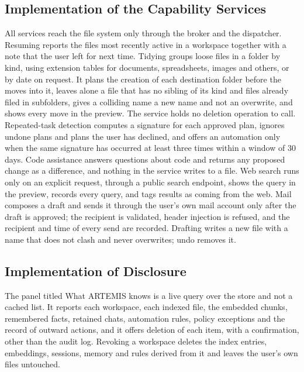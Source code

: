\documentclass{FastFyp}
\begin{document}
\subsection{Implementation of the Capability Services}
All services reach the file system only through the broker and the dispatcher. Resuming reports the files most recently active in a workspace together with a note that the user left for next time. Tidying groups loose files in a folder by kind, using extension tables for documents, spreadsheets, images and others, or by date on request. It plans the creation of each destination folder before the moves into it, leaves alone a file that has no sibling of its kind and files already filed in subfolders, gives a colliding name a new name and not an overwrite, and shows every move in the preview. The service holds no deletion operation to call. Repeated-task detection computes a signature for each approved plan, ignores undone plans and plans the user has declined, and offers an automation only when the same signature has occurred at least three times within a window of 30 days. Code assistance answers questions about code and returns any proposed change as a difference, and nothing in the service writes to a file. Web search runs only on an explicit request, through a public search endpoint, shows the query in the preview, records every query, and tags results as coming from the web. Mail composes a draft and sends it through the user's own mail account only after the draft is approved; the recipient is validated, header injection is refused, and the recipient and time of every send are recorded. Drafting writes a new file with a name that does not clash and never overwrites; undo removes it.

\subsection{Implementation of Disclosure}
The panel titled What ARTEMIS knows is a live query over the store and not a cached list. It reports each workspace, each indexed file, the embedded chunks, remembered facts, retained chats, automation rules, policy exceptions and the record of outward actions, and it offers deletion of each item, with a confirmation, other than the audit log. Revoking a workspace deletes the index entries, embeddings, sessions, memory and rules derived from it and leaves the user's own files untouched.
\end{document}
